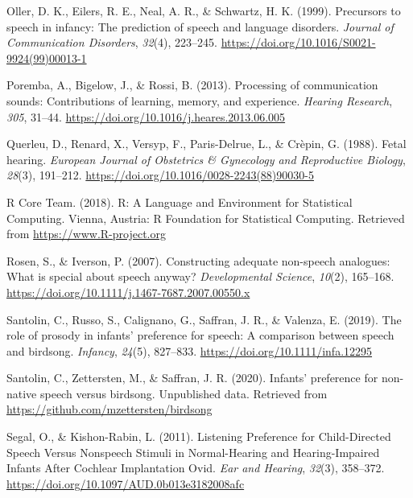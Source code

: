 \documentclass[
  man]{apa6}
\begin{document}
\leavevmode\hypertarget{ref-oller_precursors_1999}{}%
Oller, D. K., Eilers, R. E., Neal, A. R., \& Schwartz, H. K. (1999). Precursors to speech in infancy: The prediction of speech and language disorders. \emph{Journal of Communication Disorders}, \emph{32}(4), 223--245. \url{https://doi.org/10.1016/S0021-9924(99)00013-1}

\leavevmode\hypertarget{ref-poremba_processing_2013}{}%
Poremba, A., Bigelow, J., \& Rossi, B. (2013). Processing of communication sounds: Contributions of learning, memory, and experience. \emph{Hearing Research}, \emph{305}, 31--44. \url{https://doi.org/10.1016/j.heares.2013.06.005}

\leavevmode\hypertarget{ref-querleu_fetal_1988}{}%
Querleu, D., Renard, X., Versyp, F., Paris-Delrue, L., \& Crèpin, G. (1988). Fetal hearing. \emph{European Journal of Obstetrics \& Gynecology and Reproductive Biology}, \emph{28}(3), 191--212. \url{https://doi.org/10.1016/0028-2243(88)90030-5}

\leavevmode\hypertarget{ref-r_core_team_r:_2018}{}%
R Core Team. (2018). R: A Language and Environment for Statistical Computing. Vienna, Austria: R Foundation for Statistical Computing. Retrieved from \url{https://www.R-project.org}

\leavevmode\hypertarget{ref-rosen_constructing_2007}{}%
Rosen, S., \& Iverson, P. (2007). Constructing adequate non-speech analogues: What is special about speech anyway? \emph{Developmental Science}, \emph{10}(2), 165--168. \url{https://doi.org/10.1111/j.1467-7687.2007.00550.x}

\leavevmode\hypertarget{ref-santolin_role_2019}{}%
Santolin, C., Russo, S., Calignano, G., Saffran, J. R., \& Valenza, E. (2019). The role of prosody in infants' preference for speech: A comparison between speech and birdsong. \emph{Infancy}, \emph{24}(5), 827--833. \url{https://doi.org/10.1111/infa.12295}

\leavevmode\hypertarget{ref-santolin_infants_2020}{}%
Santolin, C., Zettersten, M., \& Saffran, J. R. (2020). Infants' preference for non-native speech versus birdsong. Unpublished data. Retrieved from \url{https://github.com/mzettersten/birdsong}

\leavevmode\hypertarget{ref-segal_listening_2011}{}%
Segal, O., \& Kishon-Rabin, L. (2011). Listening Preference for Child-Directed Speech Versus Nonspeech Stimuli in Normal-Hearing and Hearing-Impaired Infants After Cochlear Implantation Ovid. \emph{Ear and Hearing}, \emph{32}(3), 358--372. \url{https://doi.org/10.1097/AUD.0b013e3182008afc}
\end{document}
